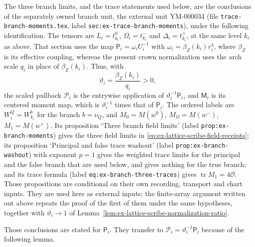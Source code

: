 The three branch limits, and the trace statements used below, are the
conclusions of the separately owned branch unit,
the external unit YM-000034 (file \texttt{trace-branch-moments.tex},
label \texttt{sec:ex-trace-branch-moments}), under the following
identification. The tensors are $L_i=t^0_{k_i}$, $\Omega_i=t^-_{k_i}$
and $\Delta_i=t^+_{k_i}$, at the same level $k_i$ as above. That
section uses the map $\mathsf P_i=\omega_iU_i^{-1}$ with
$\omega_i=\beta_Z(k_i)r_i^4$, where $\beta_Z$ is its effective coupling,
whereas the present crown normalization uses the arch scale $q_i$ in
place of $\beta_Z(k_i)$. Thus, with
\[
 \vartheta_i=\frac{\beta_Z(k_i)}{q_i}>0,
\]
the scaled pullback $\mathcal P_i$ is the entrywise application of
$\vartheta_i^{-1}\mathsf P_i$, and $\mathsf M_i$ is its centered moment
map, which is $\vartheta_i^{-1}$ times that of $\mathsf P_i$. The
ordered labels are $W_i^Q=W^{b}_{k_i}$ for the branch $b=\nu_Q$, and
$M_0=M(w^0)$, $M_\Omega=M(w^-)$, $M_1=M(w^+)$.
Its proposition `Three branch field limits' (label
\texttt{prop:ex-branch-moments}) gives the three field limits in
\eqref{eq:ex-lattice-scribe-field-receipts};
its proposition `Principal and false trace washout' (label
\texttt{prop:ex-branch-washout}) with exponent $p=1$ gives the
weighted trace limits for the principal and the false branch that are
used below, and gives nothing for the true branch;
and its trace formula (label \texttt{eq:ex-branch-three-traces}) gives
$\operatorname{tr}M_1=4\mathcal O$. Those propositions are conditional on
their own recording, transport and chart inputs. They are used here as
external inputs; the finite-array argument written out above repeats the
proof of the first of them under the same hypotheses, together with
$\vartheta_i\to1$ of Lemma~\ref{lem:ex-lattice-scribe-normalization-ratio}.

Those conclusions are stated for $\mathsf P_i$. They transfer to
$\mathcal P_i=\vartheta_i^{-1}\mathsf P_i$ because of the following lemma.

